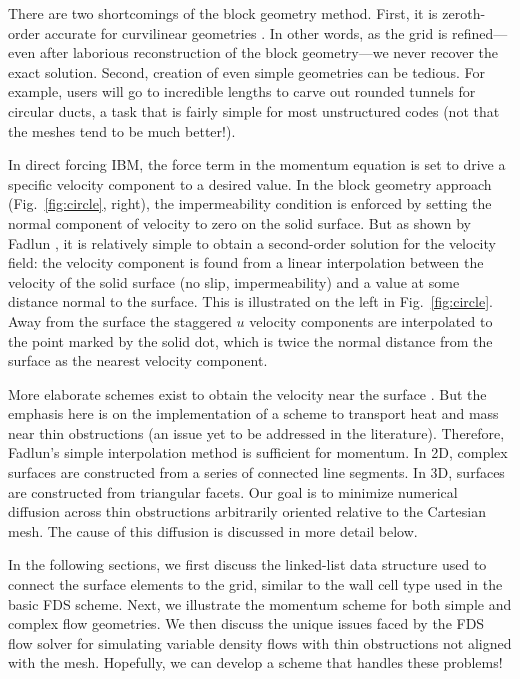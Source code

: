 \documentclass[12pt]{article}
\begin{document}
There are two shortcomings of the block geometry method.  First, it is zeroth-order accurate for curvilinear geometries \cite{Fadlun}.
In other words, as the grid is refined---even after laborious reconstruction of the block geometry---we never recover the exact solution.  Second, creation of even simple geometries can be tedious. For example, users will go to incredible lengths to carve out rounded tunnels for circular ducts, a task that is fairly simple for most unstructured codes (not that the meshes tend to be much better!).

In direct forcing IBM, the force term in the momentum equation is set to drive a specific velocity component to a desired value.  In the block geometry approach (Fig.~\ref{fig:circle}, right), the impermeability condition is enforced by setting the normal component of velocity to zero on the solid surface. But as shown by Fadlun \cite{Fadlun}, it is relatively simple to obtain a second-order solution for the velocity field: the velocity component is found from a linear interpolation between the velocity of the solid surface (no slip, impermeability) and a value at some distance normal to the surface.  This is illustrated on the left in Fig.~\ref{fig:circle}.  Away from the surface the staggered $u$ velocity components are interpolated to the point marked by the solid dot, which is twice the normal distance from the surface as the nearest velocity component.

More elaborate schemes exist to obtain the velocity near the surface \cite{Balaras,Choi,McDermott}.  But the emphasis here is on the implementation of a scheme to transport heat and mass near thin obstructions (an issue yet to be addressed in the literature).  Therefore, Fadlun's simple interpolation method is sufficient for momentum.   In 2D, complex surfaces are constructed from a series of connected line segments. In 3D, surfaces are constructed from triangular facets.  Our goal is to minimize numerical diffusion across thin obstructions arbitrarily oriented relative to the Cartesian mesh.  The cause of this diffusion is discussed in more detail below.

In the following sections, we first discuss the linked-list data structure used to connect the surface elements to the grid, similar to the wall cell type used in the basic FDS scheme.  Next, we illustrate the momentum scheme for both simple and complex flow geometries.  We then discuss the unique issues faced by the FDS flow solver for simulating variable density flows with thin obstructions not aligned with the mesh.  Hopefully, we can develop a scheme that handles these problems!
\end{document}
